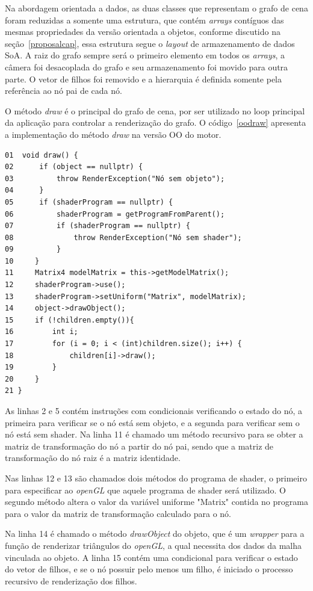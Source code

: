 Na abordagem orientada a dados, as duas classes que representam o grafo de cena foram 
reduzidas a somente uma estrutura, que contém \textit{arrays} contíguos das mesmas 
propriedades da versão orientada a objetos, conforme discutido na 
seção~\ref{proposalcap}, essa estrutura segue o \textit{layout} de armazenamento de 
dados SoA. A raiz do grafo 
sempre será o primeiro elemento em todos os \textit{arrays}, a câmera foi desacoplada 
do grafo e seu armazenamento foi movido para outra parte. O vetor de filhos foi 
removido e a hierarquia é definida somente pela referência ao nó pai de cada nó.

O método \textit{draw} é o principal do grafo de cena, por ser 
utilizado no loop principal da aplicação para controlar a 
renderização do grafo. O código~\ref{oodraw} apresenta a 
implementação do método \textit{draw} na versão OO do motor.

\begin{lstlisting}[frame=single, caption={Método draw versão OO}, label=oodraw]
01  void draw() {
02      if (object == nullptr) {
03          throw RenderException("Nó sem objeto");
04      }
05      if (shaderProgram == nullptr) {
06          shaderProgram = getProgramFromParent();
07          if (shaderProgram == nullptr) {
08              throw RenderException("Nó sem shader");
09          }
10     }
11     Matrix4 modelMatrix = this->getModelMatrix();
12     shaderProgram->use();
13     shaderProgram->setUniform("Matrix", modelMatrix);
14     object->drawObject();
15     if (!children.empty()){
16         int i;
17         for (i = 0; i < (int)children.size(); i++) {
18             children[i]->draw();
19         }
20     }
21 }
\end{lstlisting}

As linhas 2 e 5 contém instruções com condicionais verificando o 
estado do nó, a primeira para verificar se o nó está sem objeto, 
e a segunda para verificar sem o nó está sem shader. Na linha 11 
é chamado um método recursivo para se obter a matriz de 
transformação do nó a partir do nó pai, sendo que a matriz de 
transformação do nó raiz é a matriz identidade.

Nas linhas 12 e 13 são chamados dois métodos do programa de shader, 
o primeiro para especificar ao \textit{openGL} que aquele programa de shader 
será utilizado. O segundo método altera o valor da variável 
uniforme "Matrix" contida no programa para o valor da matriz 
de transformação calculado para o nó.

Na linha 14 é chamado o método \textit{drawObject} do objeto, 
que é um \textit{wrapper} para a função de renderizar triângulos 
do \textit{openGL}, a qual necessita dos dados da malha vinculada 
ao objeto. A linha 15 contém uma condicional para verificar o 
estado do vetor de filhos, e se o nó possuir pelo menos um filho, 
é iniciado o processo recursivo de renderização dos filhos.

